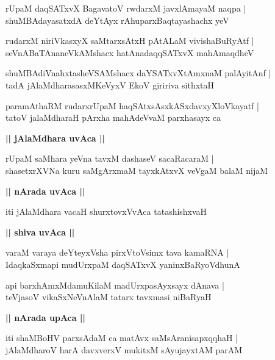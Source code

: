 \documentclass[twoside,12pt,openright]{book}
\newcounter{shloka}[chapter]
\def\uvaca#1{\centerline{{\large\textbf{#1}}}}
\begin{document}
\begin{shloka}%
rUpaM daqSATxvX BagavatoV rwdarxM javxlAmayaM naqpa |\\
shuMBAdayasatxdA deYtAyx rAhuparxBaqtayashachx yeV 
\end{shloka}

\begin{shloka}%
rudarxM niriVkasxyX saMtarxsAtxH pAtALaM vivishaBuRyAtf |\\
seVnABaTAnaneVkAMshacx hatAnadaqqSATxvX mahAmaqdheV
\end{shloka}

\begin{shloka}%
shuMBAdiVnahxtasheVSAMshacx daYSATxvXtAmxnaM palAyitAnf |\\
tadA jAlaMdharasasxMKeVyxV EkoV giririva sithxtaH
\end{shloka}

\begin{shloka}%
paramAthaRM rudarxrUpaM haqSAtxsAsxkASxdavxyXloVkayatf |\\
tatoV jalaMdharaH pArxha mahAdeVvaM parxhasayx ca
\end{shloka}

\uvaca{|| jAlaMdhara uvAca ||}

\begin{shloka}%
rUpaM saMhara yeVna tavxM dashaseV sacaRacaraM |\\
shasetxrXVNa kuru saMgArxmaM tayxkAtxvX veVgaM balaM nijaM 
\end{shloka}

\uvaca{|| nArada uvAca ||}

\begin{shloka}%
iti jAlaMdhara vacaH shurxtovxVvAca tatashishxvaH
\end{shloka}

\uvaca{|| shiva uvAca ||}

\begin{shloka}%
varaM varaya deYteyxVsha pirxVtoVsimx tava kamaRNA |\\
IdaqkaSxmapi mudUrxpaM daqSATxvX yaninxBaRyoVdhunA 
\end{shloka}

\begin{shloka}%
api barxhAmxMdamuKilaM madUrxpasAyxsayx dAnava |\\
teVjasoV vikaSxNeVnAlaM tatarx tavxmasi niBaRyaH 
\end{shloka}

\uvaca{|| nArada upAca ||}

\begin{shloka}%
iti shaMBoHV parxsAdaM ca matAvx saMsAranisapxqqhaH |\\
jAlaMdharoV harA davxverxV mukitxM sAyujayxtAM parAM 
\end{shloka}
\end{document}
